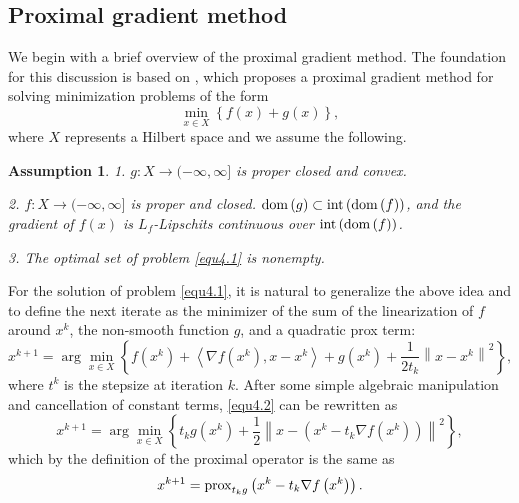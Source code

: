\documentclass[a4paper,12pt]{article}
\newtheorem{assumption}[theorem]{Assumption}
\numberwithin{equation}{section}
\begin{document}
\subsection{Proximal gradient method}\label{sec4.1}

\par We begin with a brief overview of the proximal gradient method. The foundation for this discussion is based on \cite[Chapter 10]{B17}, which proposes a proximal gradient method for solving minimization problems of the form
\begin{equation}\label{equ4.1}
    \min_{x\in X}\left\{f\left(x\right)+g\left(x\right)\right\},
\end{equation}
where $X$ represents a Hilbert space and we assume the following.

\begin{assumption}\label{ass4.1}
    1. $g: X\rightarrow (-\infty, \infty]$ is proper closed and convex.
    \item 2. $f: X\rightarrow (-\infty, \infty]$ is proper and closed. ${\rm dom}\left(g\right) \subset {\rm int}\left({\rm dom}\left(f\right)\right)$, and the gradient of $f\left(x\right)$ is $L_{f}$-Lipschits continuous over ${\rm int}\left({\rm dom}\left(f\right)\right)$.
    \item 3. The optimal set of problem \eqref{equ4.1} is nonempty.
\end{assumption}

\par For the solution of problem \eqref{equ4.1}, it is natural to generalize the above idea and to define the next iterate as the minimizer of the sum of the linearization of $f$ around $x^k$, the non-smooth function $g$, and a quadratic prox term:
\begin{equation}\label{equ4.2}
    x^{k+1}=\arg\min_{x\in X}\left\{f\left(x^{k}\right)+\left<\nabla f\left(x^{k}\right), x-x^{k}\right>+g\left(x^{k}\right)+\frac{1}{2t_{k}}\left\|x-x^{k}\right\|^{2}\right\},
\end{equation}
where $t^{k}$ is the stepsize at iteration $k$. After some simple algebraic manipulation and cancellation of constant terms, \eqref{equ4.2} can be rewritten as
\begin{equation*}
    x^{k+1}=\arg\min_{x\in X}\left\{t_{k}g\left(x^{k}\right)+ \frac{1}{2}\left\|x-\left(x^{k}-t_{k}\nabla f\left(x^{k}\right)\right)\right\|^{2}\right\},
\end{equation*}
which by the definition of the proximal operator is the same as
\begin{equation*}
    x^{k+1}={\rm prox}_{t_{k}g}\left(x^{k}-t_{k}\nabla f\left(x^{k}\right)\right).
\end{equation*}
\end{document}
